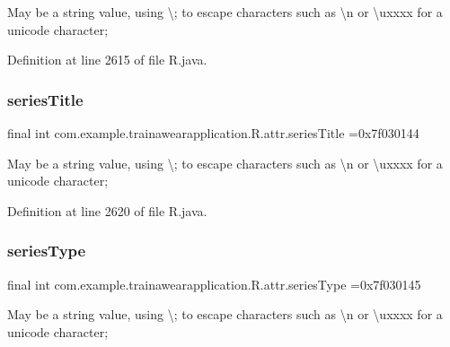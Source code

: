 May be a string value, using \textquotesingle{}\textbackslash{};\textquotesingle{} to escape characters such as \textquotesingle{}\textbackslash{}n\textquotesingle{} or \textquotesingle{}\textbackslash{}uxxxx\textquotesingle{} for a unicode character; 

Definition at line 2615 of file R.\+java.

\mbox{\label{classcom_1_1example_1_1trainawearapplication_1_1_r_1_1attr_abe5f353990d4f61057aeaa3fb61d1df8}} 
\subsubsection{\texorpdfstring{seriesTitle}{seriesTitle}}
{\footnotesize\ttfamily final int com.\+example.\+trainawearapplication.\+R.\+attr.\+series\+Title =0x7f030144\hspace{0.3cm}{\ttfamily [static]}}

May be a string value, using \textquotesingle{}\textbackslash{};\textquotesingle{} to escape characters such as \textquotesingle{}\textbackslash{}n\textquotesingle{} or \textquotesingle{}\textbackslash{}uxxxx\textquotesingle{} for a unicode character; 

Definition at line 2620 of file R.\+java.

\mbox{\label{classcom_1_1example_1_1trainawearapplication_1_1_r_1_1attr_a3e7211dd9d382695a329922a7724e0f8}} 
\subsubsection{\texorpdfstring{seriesType}{seriesType}}
{\footnotesize\ttfamily final int com.\+example.\+trainawearapplication.\+R.\+attr.\+series\+Type =0x7f030145\hspace{0.3cm}{\ttfamily [static]}}

May be a string value, using \textquotesingle{}\textbackslash{};\textquotesingle{} to escape characters such as \textquotesingle{}\textbackslash{}n\textquotesingle{} or \textquotesingle{}\textbackslash{}uxxxx\textquotesingle{} for a unicode character; 

